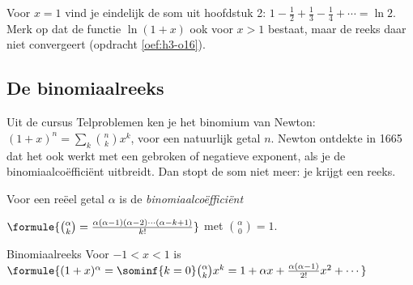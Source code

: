 Voor $x = 1$ vind je eindelijk de som uit hoofdstuk 2: $1 - \tfrac12 + \tfrac13 - \tfrac14 + \cdots = \ln 2$. Merk op dat de functie $\ln(1 + x)$ ook voor $x > 1$ bestaat, maar de reeks daar niet convergeert (opdracht \ref{oef:h3-o16}).



\begin{oefeningen}
\end{oefeningen}

\subsection{De binomiaalreeks}

Uit de cursus Telproblemen ken je het binomium van Newton: $(1 + x)^n = \sum_k \binom{n}{k} x^k$, voor een natuurlijk getal $n$. Newton ontdekte in 1665 dat het ook werkt met een gebroken of negatieve exponent, als je de binomiaalcoëfficiënt uitbreidt. Dan stopt de som niet meer: je krijgt een reeks.

\begin{theorie}
Voor een reëel getal $\alpha$ is de \emph{binomiaalcoëfficiënt}

\vspace{1mm}
\qquad $\formule{\binom{\alpha}{k} = \frac{\alpha(\alpha - 1)(\alpha - 2) \cdots (\alpha - k + 1)}{k!}}$ \qquad met $\binom{\alpha}{0} = 1$.

\begin{stelling}{Binomiaalreeks}
Voor $-1 < x < 1$ is \quad $\formule{(1 + x)^\alpha = \sominf{k=0} \binom{\alpha}{k} x^k = 1 + \alpha x + \frac{\alpha(\alpha-1)}{2!}x^2 + \cdots}$
\end{stelling}
\end{theorie}

